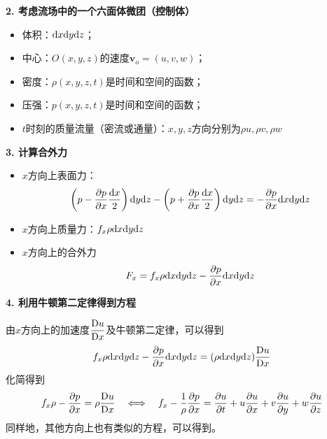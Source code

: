 \noindent \textbf{2. 考虑流场中的一个六面体微团（控制体）}
\begin{itemize}
	\item 体积：${\rm{d}} x {\rm{d}} y {\rm{d}} z$；\vspace*{-0.5em}
	\item 中心：$O(x,y,z)$的速度$\bm{v}_o = (u,v,w)$；\vspace*{-0.5em}
	\item 密度：$\rho(x,y,z,t)$是时间和空间的函数；\vspace*{-0.5em}
	\item 压强：$p(x,y,z,t)$是时间和空间的函数；\vspace*{-0.5em}
	\item $t$时刻的质量流量（密流或通量）：$x,y,z$方向分别为$\rho u , \rho v , \rho w$
\end{itemize}
\vspace*{0.5em}

\noindent \textbf{3. 计算合外力}
\begin{itemize}
	\item $x$方向上表面力：
	\begin{equation*}
		\left(p - \dfrac{\partial p}{\partial x} \dfrac{{\rm{d}} x}{2}\right) {\rm{d}} y {\rm{d}} z - \left(p + \dfrac{\partial p}{\partial x} \dfrac{{\rm{d}} x}{2}\right) {\rm{d}} y {\rm{d}} z = -\dfrac{\partial p}{\partial x} {\rm{d}} x {\rm{d}} y {\rm{d}} z
	\end{equation*}
	
	\item $x$方向上质量力：$f_x\rho {\rm{d}} x {\rm{d}} y {\rm{d}} z$
	
	\item $x$方向上的合外力
	\begin{equation}
		F_x = f_x\rho {\rm{d}} x {\rm{d}} y {\rm{d}} z - \dfrac{\partial p}{\partial x} {\rm{d}} x {\rm{d}} y {\rm{d}} z
	\end{equation}
\end{itemize}
\vspace*{0.5em}

\noindent \textbf{4. 利用牛顿第二定律得到方程}
\vspace*{0.5em}

	由$x$方向上的加速度$\dfrac{{\rm{D}} u}{{\rm{D}} x}$及牛顿第二定律，可以得到
	\begin{equation}
		 f_x\rho {\rm{d}} x {\rm{d}} y {\rm{d}} z - \dfrac{\partial p}{\partial x} {\rm{d}} x {\rm{d}} y {\rm{d}} z = (\rho {\rm{d}} x {\rm{d}} y {\rm{d}} z) \dfrac{{\rm{D}} u}{{\rm{D}} x}
	\end{equation}
	化简得到
	\begin{equation}
		f_x\rho - \dfrac{\partial p}{\partial x} = \rho \dfrac{{\rm{D}} u}{{\rm{D}} x} \quad \Longleftrightarrow \quad f_x - \dfrac{1}{\rho} \dfrac{\partial p}{\partial x} = \dfrac{\partial u}{\partial t} + u \dfrac{\partial u}{\partial x} + v\dfrac{\partial u}{\partial y} + w \dfrac{\partial u}{\partial z}
	\end{equation}
同样地，其他方向上也有类似的方程，可以得到。

